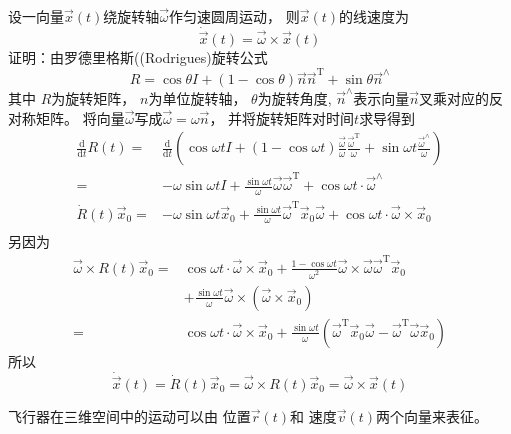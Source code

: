设一向量$\vec{x}(t)$绕旋转轴$\vec{\omega}$作匀速圆周运动，
则$\vec{x}(t)$的线速度为
\[\dot{\vec{x}}(t)=\vec{\omega}\times\vec{x}(t)\]
证明：由罗德里格斯((Rodrigues)旋转公式
\[R=\cos\theta I+(1-\cos\theta)\vec{n}\vec{n}^\text{T}+\sin\theta\vec{n}^{\wedge}\]
其中
$R$为旋转矩阵，
$n$为单位旋转轴，
$\theta$为旋转角度,
$\vec{n}^{\wedge}$表示向量$\vec{n}$叉乘对应的反对称矩阵。
将向量$\vec{\omega}$写成$\vec{\omega}=\omega\vec{n}$，
并将旋转矩阵对时间$t$求导得到
\begin{align*}
    \frac{\text{d}}{\text{d}t}R(t)
    =& \frac{\text{d}}{\text{d}t}\left(
        \cos\omega t I
        +(1-\cos\omega t)\frac{\vec{\omega}}{\omega}\frac{\vec{\omega}^\text{T}}{\omega}
        +\sin\omega t\frac{\vec{\omega}^{\wedge}}{\omega}
    \right) \\
    =& -\omega\sin\omega tI
        +\frac{\sin\omega t}{\omega}\vec{\omega}\vec{\omega}^\text{T}
        +\cos\omega t\cdot\vec{\omega}^{\wedge} \\
    \dot{R}(t)\vec{x}_0
    =& -\omega\sin\omega t\vec{x}_0
        +\frac{\sin\omega t}{\omega}\vec{\omega}^\text{T}\vec{x}_0\vec{\omega}
        +\cos\omega t\cdot\vec{\omega}\times\vec{x}_0 \\
\end{align*}
另因为
\begin{align*}
    \vec{\omega}\times R(t)\vec{x}_0
    =& \cos\omega t\cdot\vec{\omega}\times\vec{x}_0
        +\frac{1-\cos\omega t}{\omega^2}\vec{\omega}\times\vec{\omega}\vec{\omega}^\text{T}\vec{x}_0 \\
        &+ \frac{\sin\omega t}{\omega}\vec{\omega}\times(\vec{\omega}\times\vec{x}_0) \\
    =& \cos\omega t\cdot\vec{\omega}\times\vec{x}_0
        +\frac{\sin\omega t}{\omega}(\vec{\omega}^\text{T}\vec{x}_0\vec{\omega}
        -\vec{\omega}^\text{T}\vec{\omega}\vec{x}_0)
\end{align*}
所以
\[\dot{\vec{x}}(t)=\dot{R}(t)\vec{x}_0=\vec{\omega}\times R(t)\vec{x}_0=\vec{\omega}\times\vec{x}(t)\]

飞行器在三维空间中的运动可以由
位置$\vec{r}(t)$和
速度$\vec{v}(t)$两个向量来表征。

